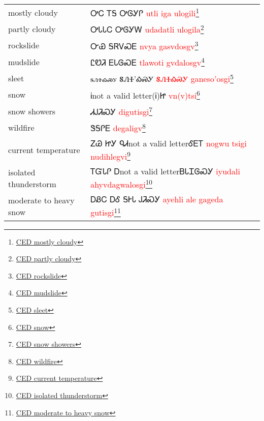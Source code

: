 \vfill\newpage\begin{minipage}{\linewidth}\begin{tabular}{p{3cm} p{11cm}}
mostly cloudy & ᎤᏟ ᎢᎦ ᎤᎶᎩᎵ 
 \newline \textcolor{red}{utli iga ulogili}\footnote{\href{https://cherokeedictionary.net/share/101972}{CED mostly cloudy}}\\
partly cloudy & ᎤᏓᏓᏟ ᎤᎶᎩᎳ 
 \newline \textcolor{red}{udadatli ulogila}\footnote{\href{https://cherokeedictionary.net/share/101973}{CED partly cloudy}}\\
rockslide & ᏅᏯ  ᎦᏒᏙᏍᎬ 
 \newline \textcolor{red}{nvya  gasvdosgv}\footnote{\href{https://cherokeedictionary.net/share/101974}{CED rockslide}}\\
mudslide & ᏝᏬᏘ  ᎬᏓᎶᏍᎬ 
 \newline \textcolor{red}{tlawoti  gvdalosgv}\footnote{\href{https://cherokeedictionary.net/share/101975}{CED mudslide}}\\
sleet & ꭶꮑꮠꭳꮝꭹ    ᎦᏁᏐ'ᎣᏍᎩ 
 \newline \textcolor{red}{ᎦᏁᏐᎣᏍᎩ    ganeso'osgi}\footnote{\href{https://cherokeedictionary.net/share/101976}{CED sleet}}\\
snow & Ꭵnot a valid letter(Ꭵ)Ꮵ 
 \newline \textcolor{red}{vn(v)tsi}\footnote{\href{https://cherokeedictionary.net/share/101977}{CED snow}}\\
snow showers & ᏗᎫᏘᏍᎩ 
 \newline \textcolor{red}{digutisgi}\footnote{\href{https://cherokeedictionary.net/share/101978}{CED snow showers}}\\
wildfire & ᏕᎦᎵᎬ 
 \newline \textcolor{red}{degaligv}\footnote{\href{https://cherokeedictionary.net/share/101979}{CED wildfire}}\\
current temperature & ᏃᏊ  ᏥᎩ ᏄᏗnot a valid letterᎴᎬᎢ 
 \newline \textcolor{red}{nogwu  tsigi nudihlegvi}\footnote{\href{https://cherokeedictionary.net/share/101980}{CED current temperature}}\\
isolated thunderstorm & ᎢᏳᏓᎵ Ꭰnot a valid letterᏴᏓᏆᎶᏍᎩ 
 \newline \textcolor{red}{iyudali ahyvdagwalosgi}\footnote{\href{https://cherokeedictionary.net/share/101981}{CED isolated thunderstorm}}\\
moderate to heavy snow & ᎠᏰᏟ  ᎠᎴ ᎦᎨᏓ  ᎫᏘᏍᎩ 
 \newline \textcolor{red}{ayehli  ale gageda  gutisgi}\footnote{\href{https://cherokeedictionary.net/share/101982}{CED moderate to heavy snow}}\\

\end{tabular}
\end{minipage}
